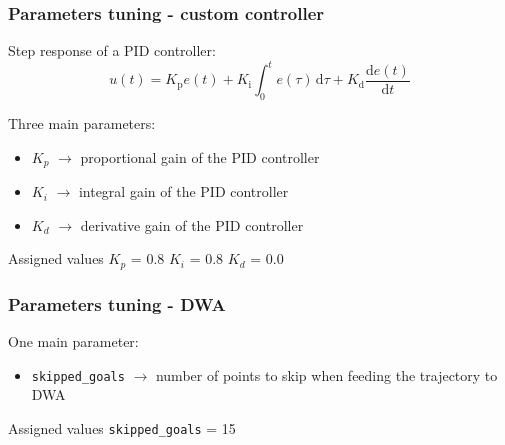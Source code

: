 \documentclass{beamer}
\begin{document}
\begin{frame}
\frametitle{Parameters tuning - custom controller}

Step response of a PID controller:
$$
u(t)=K_{\text{p}}e(t)+K_{\text{i}}\int _{0}^{t}e(\tau )\,\mathrm {d} \tau +K_{\text{d}}{\frac {\mathrm {d} e(t)}{\mathrm {d} t}}
$$

\vspace{1em}

Three main parameters:
\begin{itemize}
 \item $K_p$ $\rightarrow$ proportional gain of the PID controller
 \item $K_i$ $\rightarrow$ integral gain of the PID controller
 \item $K_d$ $\rightarrow$ derivative gain of the PID controller
\end{itemize}

\vspace{1em}

\begin{block}{Assigned values}
\centering
$K_p$ = 0.8
\hspace{3em}
$K_i$ = 0.8
\hspace{3em}
$K_d$ = 0.0
\end{block}

\end{frame}


\begin{frame}
\frametitle{Parameters tuning - DWA}

One main parameter:
\begin{itemize}
  \item \texttt{skipped\_goals} $\rightarrow$ number of points to skip when feeding the trajectory to DWA
\end{itemize}

\vspace{2em}

\begin{block}{Assigned values}
\centering
\texttt{skipped\_goals} = 15
\end{block}

\end{frame}



\end{document}

